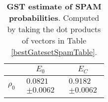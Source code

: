 \documentclass{article}[11pt]
\begin{document}
\begin{table}[h]
\begin{center}
\begin{tabular}[l]{|c|c|c|}
\hline
 & $E_{0}$ & $E_C$ \\ \hline
$\rho_{0}$ & $ \begin{array}{c} 0.0821 \\ \pm 0.0062 \end{array} $ & $ \begin{array}{c} 0.9182 \\ \pm 0.0062 \end{array} $ \\ \hline
\end{tabular}

\caption{\textbf{GST estimate of SPAM probabilities}.  Computed by taking the dot products of vectors in Table \ref{bestGatesetSpamTable}.\label{bestGatesetSpamParametersTable}}
\end{center}
\end{table}
\end{document}
